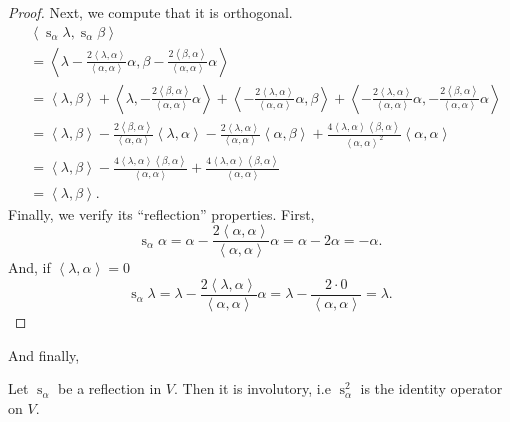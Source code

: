 \documentclass{article}
\newcommand{\innerproduct}[2]{\ensuremath{\left\langle #1 , #2 \right\rangle}}
\DeclareMathOperator{\s}{s}
\begin{document}
\begin{proof}
    Next, we compute that it is orthogonal.
    \begin{align*}
        &\innerproduct{\s_\alpha\lambda}{\s_\alpha\beta} \\
        &=
        \innerproduct{\lambda - \frac{2\innerproduct{\lambda}{\alpha}}{\innerproduct{\alpha}{\alpha}}\alpha}{\beta- \frac{2\innerproduct{\beta}{\alpha}}{\innerproduct{\alpha}{\alpha}}\alpha} \\
        &= 
        \innerproduct{\lambda}{\beta}
        +
        \innerproduct{\lambda}{-\frac{2\innerproduct{\beta}{\alpha}}{\innerproduct{\alpha}{\alpha}}\alpha}
        +
        \innerproduct{-\frac{2\innerproduct{\lambda}{\alpha}}{\innerproduct{\alpha}{\alpha}}\alpha}{\beta}
        +
        \innerproduct{-\frac{2\innerproduct{\lambda}{\alpha}}{\innerproduct{\alpha}{\alpha}}\alpha}{-\frac{2\innerproduct{\beta}{\alpha}}{\innerproduct{\alpha}{\alpha}}\alpha} \\
        &= 
        \innerproduct{\lambda}{\beta}
        -
        \frac{2\innerproduct{\beta}{\alpha}}{\innerproduct{\alpha}{\alpha}}
        \innerproduct{\lambda}{\alpha}
        -
        \frac{2\innerproduct{\lambda}{\alpha}}{\innerproduct{\alpha}{\alpha}}
        \innerproduct{\alpha}{\beta}
        +
        \frac{4\innerproduct{\lambda}{\alpha}\innerproduct{\beta}{\alpha}}{\innerproduct{\alpha}{\alpha}^2}
        \innerproduct{\alpha}{\alpha} \\
        &=
        \innerproduct{\lambda}{\beta}
        -
        \frac{4\innerproduct{\lambda}{\alpha}\innerproduct{\beta}{\alpha}}{\innerproduct{\alpha}{\alpha}}
        +
        \frac{4\innerproduct{\lambda}{\alpha}\innerproduct{\beta}{\alpha}}{\innerproduct{\alpha}{\alpha}} \\
        &= 
        \innerproduct{\lambda}{\beta}.
    \end{align*}
    Finally, we verify its ``reflection'' properties.
    First,
    \[
        \s_\alpha \alpha = \alpha - \frac{2\innerproduct{\alpha}{\alpha}}{\innerproduct{\alpha}{\alpha}}\alpha = \alpha - 2\alpha = -\alpha.
    \]
    And, if $\innerproduct{\lambda}{\alpha} = 0$
    \[
        \s_\alpha \lambda = \lambda - \frac{2\innerproduct{\lambda}{\alpha}}{\innerproduct{\alpha}{\alpha}}\alpha = \lambda - \frac{2 \cdot 0}{\innerproduct{\alpha}{\alpha}} = \lambda.
    \]
\end{proof}

And finally, 

\begin{remark}
    Let $\s_\alpha$ be a reflection in $V$.
    Then it is involutory, i.e $\s_\alpha^2$ is the identity operator on $V$.
\end{remark}
\end{document}
